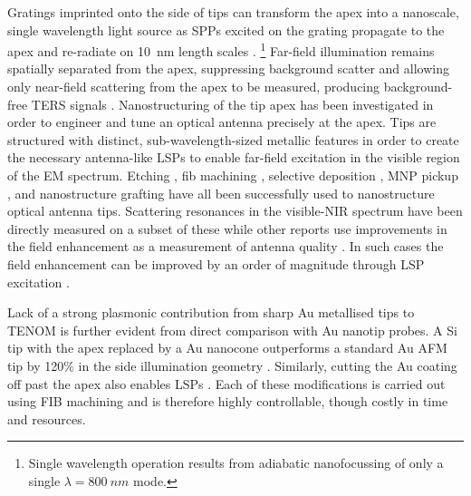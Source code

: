 \documentclass{article}
\begin{document}
Gratings imprinted onto the side of tips can transform the apex into a nanoscale, single wavelength light source as SPPs excited on the grating propagate to the apex and re-radiate on \SI{10}{nm} length scales \cite{neacsu2010}.%
\footnote{Single wavelength operation results from adiabatic nanofocussing of only a single $\lambda=\SI{800}{nm}$ mode.}
Far-field illumination remains spatially separated from the apex, suppressing background scatter and allowing only near-field scattering from the apex to be measured, producing background-free TERS signals \cite{berweger2010, berweger2012}.
Nanostructuring of the tip apex has been investigated in order to engineer and tune an optical antenna precisely at the apex. Tips are structured with distinct, sub-wavelength-sized metallic features in order to create the necessary antenna-like LSPs to enable far-field excitation in the visible region of the EM spectrum. Etching \cite{uebel2013, kharintsev2013}, \gls{fib} machining \cite{weber2010, fleischer2011, maouli2015}, selective deposition \cite{zou2009}, MNP pickup \cite{denisyuk2012}, and nanostructure grafting \cite{huth2013} have all been successfully used to nanostructure optical antenna tips. Scattering resonances in the visible-NIR spectrum have been directly measured on a subset of these \cite{zou2009, maouli2015} while other reports use improvements in the field enhancement as a measurement of antenna quality \cite{umakoshi2012, huth2013, kharintsev2013}. In such cases the field enhancement can be improved by an order of magnitude through LSP excitation \cite{weber2010, fleischer2011, umakoshi2012}.

Lack of a strong plasmonic contribution from sharp Au metallised tips to TENOM is further evident from direct comparison with Au nanotip probes. A Si tip with the apex replaced by a Au nanocone outperforms a standard Au AFM tip by 120\% in the side illumination geometry \cite{huth2013}. Similarly, cutting the Au coating off past the apex also enables LSPs \cite{zou2009}. Each of these modifications is carried out using FIB machining and is therefore highly controllable, though costly in time and resources.
\end{document}
